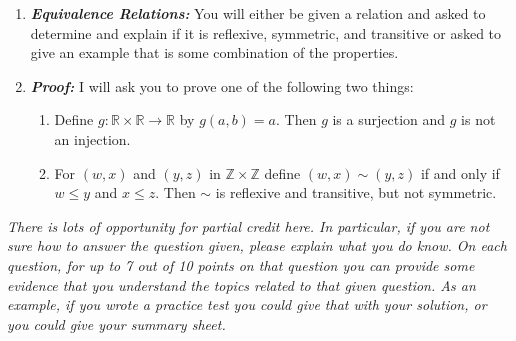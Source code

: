 \documentclass[12pt]{amsart}
\theoremstyle{definition}
\newcommand{\R}{\mathbb{R}}
\newcommand{\Z}{\mathbb{Z}}
\begin{document}
\begin{enumerate}
\item \emph{\bf Equivalence Relations:} You will either be given a relation and asked to determine and explain if it is reflexive, symmetric, and transitive or asked to give an example that is some combination of the properties.
\item \emph{\bf Proof:} I will ask you to prove one of the following two things:
	\begin{enumerate}
	\item Define $g:\R\times\R \to\R$ by $g(a,b) = a$. Then $g$ is a surjection and $g$ is not an injection.
	\item For $(w,x)$ and $(y,z)$ in $\Z\times \Z$ define $(w,x)\sim (y,z)$ if and only if $w\leq y$ and $x\leq z$. Then $\sim$ is reflexive and transitive, but not symmetric.
	\end{enumerate}
	
\end{enumerate}
\vspace{.5in}

\emph{There is lots of opportunity for partial credit here. In particular, if you are not sure how to answer the question given, please explain what you do know. On each question, for up to 7 out of 10 points on that question you can provide some evidence that you understand the topics related to that given question. As an example, if you wrote a practice test you could give that with your solution, or you could give your summary sheet.}
\end{document}
